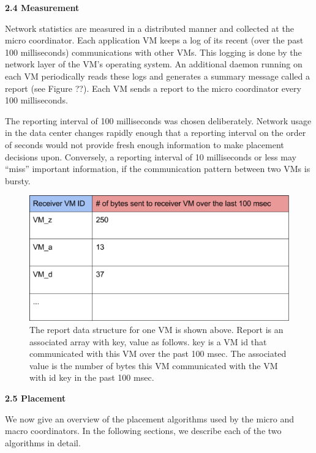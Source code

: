 \documentclass[11pt]{article}
\begin{document}
\Large{\textbf{2.4 Measurement}}
\normalsize

Network statistics are measured in a distributed manner and collected at the micro coordinator.  Each application VM keeps a log of its recent (over the past 100 milliseconds) communications with other VMs.  This logging is done by the network layer of the VM’s operating system.  An additional daemon running on each VM periodically reads these logs and generates a summary message called a report (see Figure ??).  Each VM sends a report to the micro coordinator every 100 milliseconds.

The reporting interval of 100 milliseconds was chosen deliberately.  Network usage in the data center changes rapidly enough that a reporting interval on the order of seconds would not provide fresh enough information to make placement decisions upon.  Conversely, a reporting interval of 10 milliseconds or less may “miss” important information, if the communication pattern between two VMs is bursty.

\begin{figure}
  \centering
\includegraphics[scale=0.65]{measurement.png}

 \caption{The report data structure for one VM is shown above. Report is an associated array with key, value as follows. key is a VM id that communicated with this VM over the past 100 msec. The associated value is the number of bytes this VM communicated with the VM with id key in the past 100 msec.}
 
\end{figure}

\FloatBarrier
\Large{\textbf{2.5 Placement}}

\normalsize

We now give an overview of the placement algorithms used by the micro and macro coordinators.  In the following sections, we describe each of the two algorithms in detail.
\end{document}
